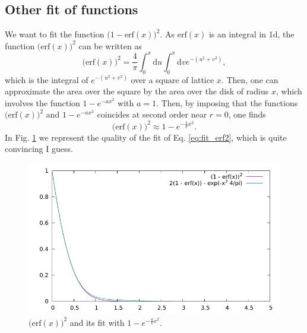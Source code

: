 \documentclass[aip,jcp,reprint,noshowkeys,superscriptaddress]{revtex4-1}
\begin{document}
\subsection{Other fit of functions}
We want to fit the function $\bigg(1 - \text{erf}(x)\bigg)^2$.
As $\text{erf}(x)$ is an integral in 1d, the function $\big(\text{erf}(x)\big)^2$ can be written as 
\begin{equation}
 \big(\text{erf}(x)\big)^2 = \frac{4}{\pi}\int_{0}^{x} \text{d}u \int_{0}^{x} \text{d}v e^{-(u^2+v^2)}, 
\end{equation}
which is the integral of $e^{-(u^2+v^2)}$ over a square of lattice $x$. 
Then, one can approximate the area over the square by the area over the disk of radius $x$, which involves the function $1 - e^{-a x^2}$ with $a=1$. Then, by imposing that the functions $\big(\text{erf}(x)\big)^2$ and $1 - e^{-a x^2}$ coincides at second order near $r=0$, one finds 
\begin{equation}
 \label{eq:fit_erf2}
 \big(\text{erf}(x)\big)^2 \approx 1 - e^{-\frac{4}{\pi} x^2}.
\end{equation}
In Fig. \ref{fig_fit_erf2} we represent the quality of the fit of Eq. \eqref{eq:fit_erf2}, which is quite convincing I guess. 
\begin{figure}
 \label{fig_fit_erf2}
        \includegraphics[width=1.00\linewidth]{fit_erf2.pdf}
        \caption{$\big(\text{erf}(x)\big)^2$ and its fit with $1 - e^{-\frac{4}{\pi} x^2}$.}
\end{figure}


\end{document}
